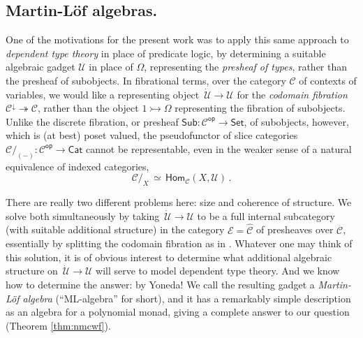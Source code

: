\documentclass[12pt,reqno]{amsart}
\newcommand{\CC}{\ensuremath{\mathcal{C}}}
\newcommand{\EE}{\ensuremath{\mathcal{E}}}
\newcommand{\op}[1]{\ensuremath{{#1}^{\mathsf{op}}}}
\newcommand{\Set}{\ensuremath{\mathsf{Set}}}
\newcommand{\Hom}{\ensuremath{\mathsf{Hom}}}
\newcommand{\mono}{\ensuremath{\rightarrowtail}}
\renewcommand{\epi}{\ensuremath{\twoheadrightarrow}}
\renewcommand{\to}{\ensuremath{\rightarrow}}
\newcommand{\U}{\ensuremath{\mathcal{U}}}
\newcommand{\UU}{\ensuremath{\,\dot{\mathcal{U}}}}
\theoremstyle{remark}
\theoremstyle{definition}
\begin{document}
\subsection*{Martin-L\"of algebras.} One of the motivations for the present work was to apply this same approach to \emph{dependent type theory} in place of predicate logic, by determining a suitable algebraic gadget $\U$ in place of $\Omega$, representing the \emph{presheaf of types}, rather than the presheaf of subobjects.  In fibrational terms, over the category $\CC$ of contexts of variables, we would like a representing object $\UU \to \U$ for the \emph{codomain fibration} $\CC^\downarrow \epi \CC$, rather than the object $1\mono \Omega$ representing the fibration of subobjects.  Unlike the discrete fibration, or presheaf $\mathsf{Sub} : \op{\CC} \to \Set$, of subobjects, however, which is (at best) poset valued, the pseudofunctor of slice categories $\CC/_{\!(-)} : \op{\CC} \to \mathsf{Cat}$ cannot be representable, even in the weaker sense of a natural equivalence of indexed categories,
\[
\CC/_{X}\, \simeq\, \Hom_{\CC}(X, \U)\,.
\]

There are really two different problems here: size and coherence of structure.  We solve both simultaneously by taking $\UU \to \U$ to be a full internal subcategory (with suitable additional structure) in the category $\EE = \widehat{\CC}$ of presheaves over $\CC$, essentially by splitting the codomain fibration as in \cite{Lums-Warren}.  Whatever one may think of this solution, it is of obvious interest to determine what additional algebraic structure on $\UU \to \U$ will serve to model dependent type theory. And we know how to determine the answer: by Yoneda!  We call the resulting gadget a \emph{Martin-L\"of algebra} (``ML-algebra'' for short), and it has a remarkably simple description as an algebra for a polynomial monad, giving a complete answer to our question (Theorem \ref{thm:nmcwf}).
\end{document}
